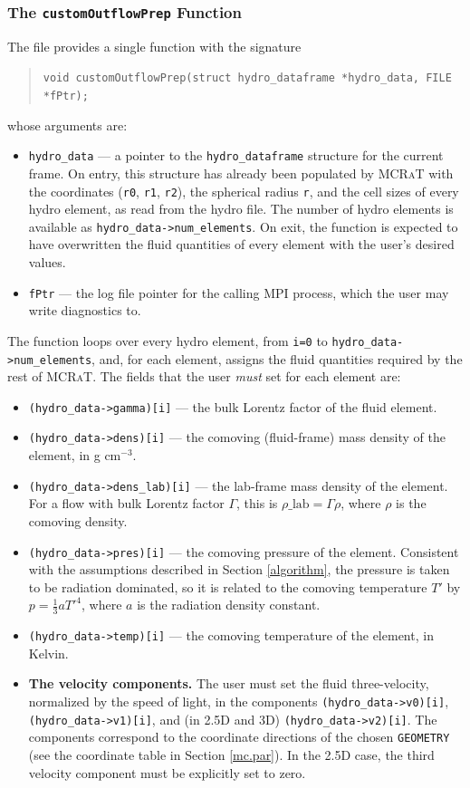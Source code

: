 \documentclass[12pt,a4paper]{article}
\newcommand{\mcrat}{\textsc{MCRaT}}
\begin{document}
\subsubsection{The \texttt{customOutflowPrep} Function}
The file provides a single function with the signature
\begin{quotation}
	\texttt{void customOutflowPrep(struct hydro\_dataframe *hydro\_data, FILE *fPtr);}
\end{quotation}
whose arguments are:
\begin{itemize}
	\item \texttt{hydro\_data} --- a pointer to the \texttt{hydro\_dataframe} structure for the current frame. On entry, this structure has already been populated by \mcrat{} with the coordinates (\texttt{r0}, \texttt{r1}, \texttt{r2}), the spherical radius \texttt{r}, and the cell sizes of every hydro element, as read from the hydro file. The number of hydro elements is available as \texttt{hydro\_data->num\_elements}. On exit, the function is expected to have overwritten the fluid quantities of every element with the user's desired values.
	\item \texttt{fPtr} --- the log file pointer for the calling MPI process, which the user may write diagnostics to.
\end{itemize}The function loops over every hydro element, from \texttt{i=0} to \texttt{hydro\_data->num\_elements}, and, for each element, assigns the fluid quantities required by the rest of \mcrat{}. The fields that the user \emph{must} set for each element are:
\begin{itemize}
	\item \texttt{(hydro\_data->gamma)[i]} --- the bulk Lorentz factor of the fluid element.
	\item \texttt{(hydro\_data->dens)[i]} --- the comoving (fluid-frame) mass density of the element, in g cm$^{-3}$.
	\item \texttt{(hydro\_data->dens\_lab)[i]} --- the lab-frame mass density of the element. For a flow with bulk Lorentz factor $\Gamma$, this is $\rho\_\mathrm{lab}=\Gamma\rho$, where $\rho$ is the comoving density.
	\item \texttt{(hydro\_data->pres)[i]} --- the comoving pressure of the element. Consistent with the assumptions described in Section \ref{algorithm}, the pressure is taken to be radiation dominated, so it is related to the comoving temperature $T'$ by $p=\frac{1}{3}aT'^4$, where $a$ is the radiation density constant.
	\item \texttt{(hydro\_data->temp)[i]} --- the comoving temperature of the element, in Kelvin.
	\item \textbf{The velocity components.} The user must set the fluid three-velocity, normalized by the speed of light, in the components \texttt{(hydro\_data->v0)[i]}, \texttt{(hydro\_data->v1)[i]}, and (in 2.5D and 3D) \texttt{(hydro\_data->v2)[i]}. The components correspond to the coordinate directions of the chosen \texttt{GEOMETRY} (see the coordinate table in Section \ref{mc.par}). In the 2.5D case, the third velocity component must be explicitly set to zero.
\end{itemize}
\end{document}
